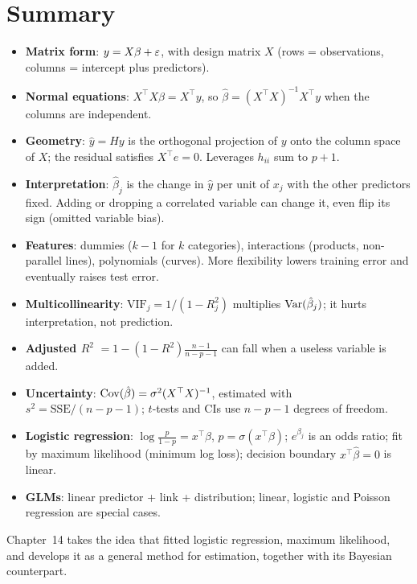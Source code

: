\section{Summary}
\label{sec:mlr-summary}

\begin{itemize}
  \item \textbf{Matrix form}: $y = X\beta + \varepsilon$, with design matrix $X$ (rows =
  observations, columns = intercept plus predictors).
  \item \textbf{Normal equations}: $X^\top X\hat\beta = X^\top y$, so
  $\hat\beta = (X^\top X)^{-1}X^\top y$ when the columns are independent.
  \item \textbf{Geometry}: $\hat y = Hy$ is the orthogonal projection of $y$ onto the column
  space of $X$; the residual satisfies $X^\top e = 0$. Leverages $h_{ii}$ sum to $p+1$.
  \item \textbf{Interpretation}: $\hat\beta_j$ is the change in $\hat y$ per unit of
  $x_j$ with the other predictors fixed. Adding or dropping a correlated variable can change
  it, even flip its sign (omitted variable bias).
  \item \textbf{Features}: dummies ($k-1$ for $k$ categories), interactions (products,
  non-parallel lines), polynomials (curves). More flexibility lowers training error and
  eventually raises test error.
  \item \textbf{Multicollinearity}: $\text{VIF}_j = 1/(1-R_j^2)$ multiplies
  $\operatorname{Var}(\hat\beta_j)$; it hurts interpretation, not prediction.
  \item \textbf{Adjusted $R^2$} $= 1-(1-R^2)\frac{n-1}{n-p-1}$ can fall when a useless
  variable is added.
  \item \textbf{Uncertainty}: $\operatorname{Cov}(\hat\beta) = \sigma^2(X^\top X)^{-1}$, estimated with
  $s^2 = \text{SSE}/(n-p-1)$; $t$-tests and CIs use $n-p-1$ degrees of freedom.
  \item \textbf{Logistic regression}: $\log\frac{p}{1-p} = x^\top\beta$,
  $p = \sigma(x^\top\beta)$; $e^{\beta_j}$ is an odds ratio; fit by maximum likelihood
  (minimum log loss); decision boundary $x^\top\hat\beta = 0$ is linear.
  \item \textbf{GLMs}: linear predictor + link + distribution; linear, logistic and
  Poisson regression are special cases.
\end{itemize}

Chapter~14 takes the idea that fitted logistic regression, maximum likelihood, and
develops it as a general method for estimation, together with its Bayesian counterpart.

